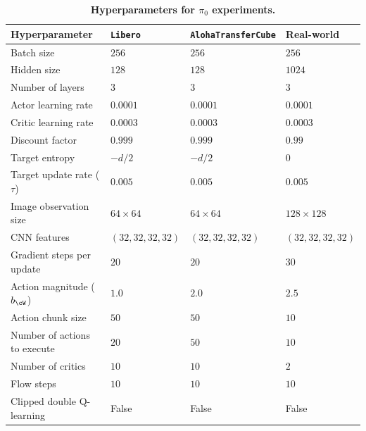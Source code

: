 \begin{table}[t]
\caption{
\footnotesize
\textbf{Hyperparameters for \algname \texttt{$\pi_0$} experiments.}
}
\vspace{5pt}
\label{table:pi0_hyp}

\begin{center}
\scalebox{0.9}
{
\begin{tabular}{llll}
    \toprule
    \textbf{Hyperparameter} & \texttt{Libero} & \texttt{AlohaTransferCube} & Real-world \\
    \midrule
Batch size & $256$ & $256$ & $256$ \\
Hidden size & $128$ & $128$ & $1024$ \\
Number of layers & $3$ & $3$ & $3$ \\
Actor learning rate  & $0.0001$ & $0.0001$ & $0.0001$ \\
Critic learning rate & $0.0003$ & $0.0003$ & $0.0003$ \\
Discount factor & $0.999$ & $0.999$ & $0.99$ \\
Target entropy & $-d/2$ & $-d/2$ & 0 \\
Target update rate ($\tau$) & $0.005$ & $0.005$ & $0.005$ \\
Image observation size & $64 \times 64$ & $64 \times 64$ & $128 \times 128$  \\
CNN features & $(32, 32, 32, 32)$ & $(32, 32, 32, 32)$ & $(32, 32, 32, 32)$  \\
Gradient steps per update & $20$ & $20$ & $30$ \\
Action magnitude ($\actmag$) & $1.0$ & $2.0$ & $2.5$ \\
Action chunk size & $50$ & $50$ & $10$ \\
Number of actions to execute & $20$ & $50$ & $10$  \\
Number of critics & $10$ & $10$ & $2$ \\
Flow steps & $10$ & $10$ & $10$ \\
Clipped double Q-learning & False & False & False \\
    \bottomrule
\end{tabular}
}
\end{center}
\end{table}









